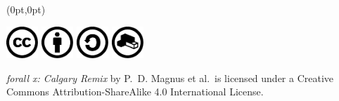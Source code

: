 \documentclass{memoir}
\newlength{\coverheight}
\newlength{\spinewidth}
\newlength{\spinepos} %
\begin{document}
\begin{textblock*}{\spinepos}(0pt,0pt)
  \noindent\hspace{1.5cm}
  \begin{minipage}[b][\coverheight][b]{.85\spinepos}
\begin{minipage}[b]{2.5cm}
\includegraphics[width=1.2cm]{assets/cc.pdf}
\includegraphics[width=1.2cm]{assets/by.pdf}
\includegraphics[width=1.2cm]{assets/sa.pdf}
\includegraphics[width=1.2cm]{assets/remix.pdf}
\end{minipage}
\hspace{.3cm}
\begin{minipage}[b]{4.7cm}
  \fontsize{11pt}{1.2em}\selectfont\color{white}\textit{forall x:
    Calgary Remix} by P.~D. Magnus et al.\ is licensed under a
  Creative Commons Attribution-Share\-Alike 4.0 International License.

\end{minipage}
\hfill\color{black}

\vspace*{2cm}
  \end{minipage}
  \hfill
\end{textblock*}
\end{document}
